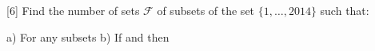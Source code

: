 [6] Find the number of sets $\mathcal{F}$ of subsets of the set $\{1,\ldots,2014\}$ such that:

a) For any subsets 
b) If   and  then 